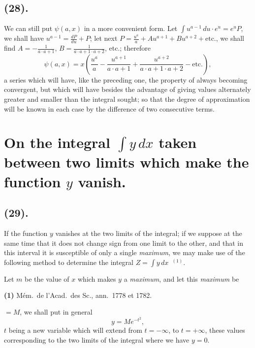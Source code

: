 \documentclass{article}
\begin{document}
\subsection*{(28).}

We can still put $\psi(a,x)$ in a more convenient form. Let $\displaystyle\int u^{a-1}\,du\cdot e^{u}=e^{u}P$, we shall have $u^{a-1}=\frac{dP}{du}+P$; let next $P=\frac{u^{a}}{a}+Au^{a+1}+Bu^{a+2}+\text{etc.}$, we shall find $A=-\frac{1}{a\cdot a+1}$, $B=\frac{1}{a\cdot a+1\cdot a+2}$, etc.; therefore
\[ \psi(a,x)=x\left(\frac{u^{a}}{a}-\frac{u^{a+1}}{a\cdot a+1}+\frac{u^{a+2}}{a\cdot a+1\cdot a+2}-\text{etc.}\right), \tag{5} \]
a series which will have, like the preceding one, the property of always becoming convergent, but which will have besides the advantage of giving values alternately greater and smaller than the integral sought; so that the degree of approximation will be known in each case by the difference of two consecutive terms.

\section*{On the integral $\displaystyle\int y\,dx$ taken between two limits which make the function $y$ vanish.}

\subsection*{(29).}

If the function $y$ vanishes at the two limits of the integral; if we suppose at the same time that it does not change sign from one limit to the other, and that in this interval it is susceptible of only a single \emph{maximum}, we may make use of the following method to determine the integral $Z=\displaystyle\int y\,dx$~${}^{(1)}$.

Let $m$ be the value of $x$ which makes $y$ a \emph{maximum}, and let this \emph{maximum} be

\textbf{(1)} Mém.\ de l'Acad.\ des Sc., ann.\ 1778 et 1782.

$=M$, we shall put in general
\[ y=Me^{-t^{2}}, \]
$t$ being a new variable which will extend from $t=-\infty$, to $t=+\infty$, these values corresponding to the two limits of the integral where we have $y=0$.
\end{document}

